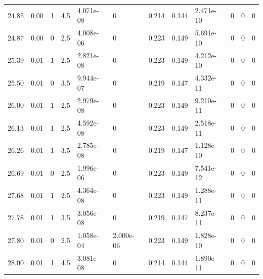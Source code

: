 \documentclass[preview]{standalone}
\begin{document}
{{{\begin{tabular}{L{1.2cm}C{1.2cm} C{0.3cm}C{0.5cm} C{1.4cm}C{1.4cm} C{1.4cm}C{1.4cm} C{1.6cm}C{1.6cm} C{1.6cm}C{1.6cm}}
  24.85  &  0.00  & 1     & 4.5 &  4.071e-08  & 0  &  0.214&   0.144& 2.471e-10 & 0   &  0 & 0  \\ 
  24.87  &  0.00  & 0     & 2.5 &  4.008e-06  & 0  &  0.223&   0.149& 5.691e-10 & 0   &  0 & 0  \\ 
  25.39  &  0.01  & 1     & 2.5 &  2.821e-08  & 0  &  0.223&   0.149& 4.212e-10 & 0   &  0 & 0  \\ 
  25.50  &  0.01  & 0     & 3.5 &  9.944e-07  & 0  &  0.219&   0.147& 4.332e-11 & 0   &  0 & 0  \\ 
  26.00  &  0.01  & 1     & 2.5 &  2.979e-08  & 0  &  0.223&   0.149& 9.210e-11 & 0   &  0 & 0  \\ 
  26.13  &  0.01  & 1     & 2.5 &  4.592e-08  & 0  &  0.223&   0.149& 2.518e-11 & 0   &  0 & 0  \\ 
  26.26  &  0.01  & 1     & 3.5 &  2.785e-08  & 0  &  0.219&   0.147& 1.128e-10 & 0   &  0 & 0  \\ 
  26.69  &  0.01  & 0     & 2.5 &  1.996e-06  & 0  &  0.223&   0.149& 7.541e-12 & 0   &  0 & 0  \\ 
  27.68  &  0.01  & 1     & 2.5 &  4.364e-08  & 0  &  0.223&   0.149& 1.288e-11 & 0   &  0 & 0  \\ 
  27.78  &  0.01  & 1     & 3.5 &  3.056e-08  & 0  &  0.219&   0.147& 8.237e-11 & 0   &  0 & 0  \\ 
  27.80  &  0.01  & 0     & 2.5 &  1.058e-04  & 2.000e-06  &  0.223&   0.149& 1.828e-10 & 0   &  0 & 0  \\ 
  28.00  &  0.01  & 1     & 4.5 &  3.081e-08  & 0  &  0.214&   0.144& 1.890e-11 & 0   &  0 & 0  \\ 
\hline 
\end{tabular} 

}}}
\end{document}
